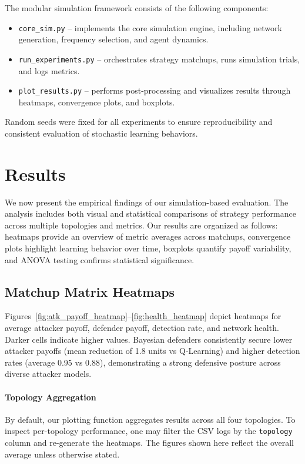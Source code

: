 \documentclass[conference]{IEEEtran}
\begin{document}
The modular simulation framework consists of the following components:
\begin{itemize}
    \item \texttt{core\_sim.py} – implements the core simulation engine, including network generation, frequency selection, and agent dynamics.
    \item \texttt{run\_experiments.py} – orchestrates strategy matchups, runs simulation trials, and logs metrics.
    \item \texttt{plot\_results.py} – performs post-processing and visualizes results through heatmaps, convergence plots, and boxplots.
\end{itemize}

Random seeds were fixed for all experiments to ensure reproducibility and consistent evaluation of stochastic learning behaviors.

\section{Results}

We now present the empirical findings of our simulation-based evaluation. The analysis includes both visual and statistical comparisons of strategy performance across multiple topologies and metrics. Our results are organized as follows: heatmaps provide an overview of metric averages across matchups, convergence plots highlight learning behavior over time, boxplots quantify payoff variability, and ANOVA testing confirms statistical significance.

\subsection{Matchup Matrix Heatmaps}
Figures~\ref{fig:atk_payoff_heatmap}--\ref{fig:health_heatmap} depict heatmaps for average attacker payoff, defender payoff, detection rate, and network health. Darker cells indicate higher values. Bayesian defenders consistently secure lower attacker payoffs (mean reduction of 1.8 units vs Q-Learning) and higher detection rates (average 0.95 vs 0.88), demonstrating a strong defensive posture across diverse attacker models.

\paragraph{Topology Aggregation}  
By default, our plotting function aggregates results across all four topologies. To inspect per-topology performance, one may filter the CSV logs by the \texttt{topology} column and re-generate the heatmaps. The figures shown here reflect the overall average unless otherwise stated.
\end{document}
